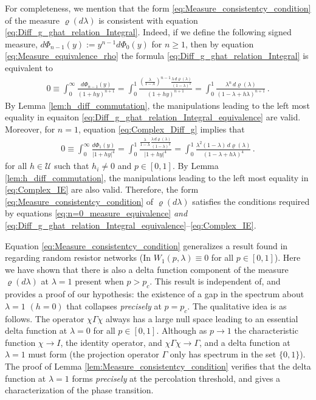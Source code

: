 \documentclass[english,12pt]{ttuthes}
\begin{document}
For completeness, we mention that the form
\eqref{eq:Measure_consistentcy_condition} of the measure $\varrho(d\lambda)$ is 
consistent with equation
\eqref{eq:Diff_g_ghat_relation_Integral}. Indeed, if we define the
following signed measure,
$d\Phi_{n-1}(y):=y^{n-1}d\Phi_0(y)$ for $n\geq1$, then by equation
\eqref{eq:Measure_equivalence_rho} the formula
\eqref{eq:Diff_g_ghat_relation_Integral} is equivalent to         
%
\begin{align}\label{eq:Diff_g_ghat_relation_Integral_equivalence}  
   0\equiv\int_0^\infty\frac{d\Phi_{n-1}(y)}{(1+hy)^{n+1}}
    =\int_0^1\frac{\left(\frac{\lambda}{1-\lambda}\right)^{n-1}\frac{\lambda\,d\varrho(\lambda)}{(1-\lambda)^2}}
             {(1+hy)^{n+1}}
    =\int_0^1\frac{\lambda^n\,d\varrho(\lambda)}{(1-\lambda+h\lambda)^{n+1}}\,.
\end{align}
%
By Lemma \ref{lem:h_diff_commutation}, the manipulations leading to
the left most equality in equaiton
\eqref{eq:Diff_g_ghat_relation_Integral_equivalence} are 
valid.  Moreover, for $n=1$, equation \eqref{eq:Complex_Diff_g}
implies that
%
\begin{align}\label{eq:Complex_IE} 
  0\equiv\int_0^\infty\frac{d\Phi_1(y)}{|1+hy|^4}=\int_0^1\frac{\frac{\lambda}{1-\lambda}\frac{\lambda\,d\varrho(\lambda)}{(1-\lambda)^2}}
             {|1+hy|^4}
    =\int_0^1\frac{\lambda^2(1-\lambda)\,d\varrho(\lambda)}{(1-\lambda+h\lambda)^4}\,.
\end{align}
%
for all $h\in\mathcal{U}$ such that $h_i\neq0$ and $p\in[0,1]$. By Lemma
\ref{lem:h_diff_commutation}, the manipulations leading to 
the left most equality in \eqref{eq:Complex_IE} are also
valid. Therefore, the form \eqref{eq:Measure_consistentcy_condition} of
$\varrho(d\lambda)$ satisfies the conditions required by equations
\eqref{eq:n=0_measure_equivalence} \emph{and} 
\eqref{eq:Diff_g_ghat_relation_Integral_equivalence}--\eqref{eq:Complex_IE}.

Equation \eqref{eq:Measure_consistentcy_condition} generalizes a
result found in \cite{Day:JPCM-96} regarding random resistor networks
(In \cite{Day:JPCM-96} $W_1(p,\lambda)\equiv0$ for all $p\in[0,1]$). Here we have
shown that there is also a delta function component of the measure
$\varrho(d\lambda)$ at $\lambda=1$ present when $p>p_c$. This result is independent of,
and provides a proof of our hypothesis: the existence of a gap in the
spectrum about $\lambda=1$ $(h=0)$ that collapses \emph{precisely} at
$p=p_c$. The qualitative idea is as follows. The operator $\chi\Gamma\chi$ always
has a large null space leading to an essential delta function at
$\lambda=0$ for all $p\in[0,1]$. Although as $p\to1$ the characteristic function
$\chi\to I$, the identity operator, and $\chi\Gamma\chi\to\Gamma$, and a delta function at
$\lambda=1$ must form (the projection operator $\Gamma$ only has spectrum in the
set $\{0,1\}$). The proof of Lemma
\eqref{lem:Measure_consistentcy_condition} verifies that the delta
function at $\lambda=1$ forms \emph{precisely} at the percolation threshold,
and gives a characterization of the phase transition.  
%
\end{document}

